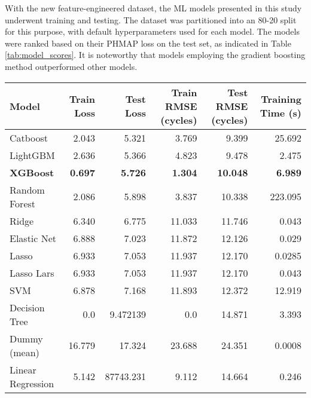 \documentclass{IEEEtran}
\begin{document}
            With the new feature-engineered dataset, the ML models presented in this study underwent training and testing. The dataset was partitioned into an 80-20 split for this purpose, with default hyperparameters used for each model. The models were ranked based on their PHMAP loss on the test set, as indicated in Table \ref{tab:model_scores}. It is noteworthy that models employing the gradient boosting method outperformed other models.
            \begin{table*}[!htbp]
                \centering
                \caption{Train and Test metrics for the selected suite of ML models.}
                \label{tab:model_scores}
                \begin{tabular}{lrrrrr}
                    \toprule
                    Model & Train Loss & Test Loss & Train RMSE (cycles) & Test RMSE (cycles) & Training Time (s) \\
                    \midrule
                    Catboost & 2.043 & 5.321 & 3.769 & 9.399 & 25.692 \\
                    LightGBM & 2.636 & 5.366 & 4.823 & 9.478 & 2.475 \\
                    \textbf{XGBoost} & \textbf{0.697} & \textbf{5.726} & \textbf{1.304} & \textbf{10.048} & \textbf{6.989} \\
                    Random Forest & 2.086 & 5.898 & 3.837 & 10.338 & 223.095 \\
                    Ridge & 6.340 & 6.775 & 11.033 & 11.746 & 0.043 \\
                    Elastic Net & 6.888 & 7.023 & 11.872 & 12.126 & 0.029 \\
                    Lasso & 6.933 & 7.053 & 11.937 & 12.170 & 0.0285 \\
                    Lasso Lars & 6.933 & 7.053 & 11.937 & 12.170 & 0.043 \\
                    SVM & 6.878 & 7.168 & 11.893 & 12.372 & 12.919 \\
                    Decision Tree & 0.0 & 9.472139 & 0.0 & 14.871 & 3.393 \\
                    Dummy (mean) & 16.779 & 17.324 & 23.688 & 24.351 & 0.0008 \\
                    Linear Regression & 5.142 & 87743.231 & 9.112 & 14.664 & 0.246 \\
                    \bottomrule
                \end{tabular}
            \end{table*}
\end{document}
